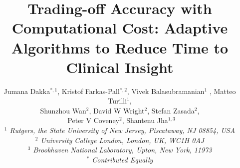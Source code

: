 \documentclass[conference]{IEEEtran}
\begin{document}


\title{Trading-off Accuracy with Computational Cost: Adaptive Algorithms to Reduce Time to Clinical Insight}




\author{Jumana Dakka$^{*,1}$, Kristof Farkas-Pall$^{*,2}$, Vivek Balasubramanian$^{1}$ , Matteo Turilli$^{1}$, \\
 Shunzhou Wan$^{2}$, David W Wright$^{2}$, Stefan Zasada$^{2}$, \\\
 Peter V Coveney$^{2}$, Shantenu Jha$^{1,3}$ \\

  \small{\emph{$^{1}$ Rutgers, the State University of New Jersey, Piscataway, NJ 08854, USA}}\\
   \small{\emph{$^{2}$ University College London, London, UK, WC1H 0AJ}}\\
   \small{\emph{$^{3}$ Brookhaven National Laboratory, Upton, New York, 11973}}\\
   \small{\emph{$^{*}$ Contributed Equally}}
}


\date{}
\maketitle
\end{document}
